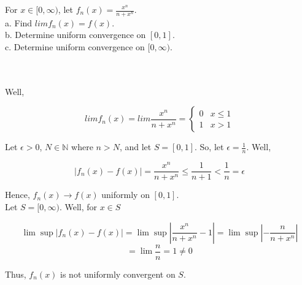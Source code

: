 For $x\in[0,\infty)$, let $f_n(x)=\frac{x^n}{n+x^n}$.\\

a. Find $limf_n(x)=f(x)$.\\

b. Determine uniform convergence on $[0,1]$.\\

c. Determine uniform convergence on $[0,\infty)$.\\\\

\begin{solution}\renewcommand{\qedsymbol}{}\ \\
    Well,
    
    $$limf_n(x)=lim\frac{x^n}{n+x^n}=\left \{ \begin{array}{cc} 0 & x \leq 1 \\ 
                                                                1 & x > 1 \end{array} \right.$$

    Let $\epsilon>0$, $N\in\mathbb{N}$ where $n>N$, and let $S=[0,1]$. So, let $\epsilon=\frac1n$. Well,
    
    $$|f_n(x)-f(x)|=\frac{x^n}{n+x^n}\leq\frac{1}{n+1}<\frac1n=\epsilon$$
    
    Hence, $f_n(x)\rightarrow f(x)$ uniformly on $[0,1]$.\\

    Let $S=[0,\infty)$. Well, for $x\in S$
    
    $$\lim\sup|f_n(x)-f(x)|=\lim\sup|\frac{x^n}{n+x^n}-1|=\lim\sup|-\frac{n}{n+x^n}|$$
    $$=\lim\frac{n}{n}=1\neq0$$
    
    Thus, $f_n(x)$ is not uniformly convergent on $S$.

\end{solution}